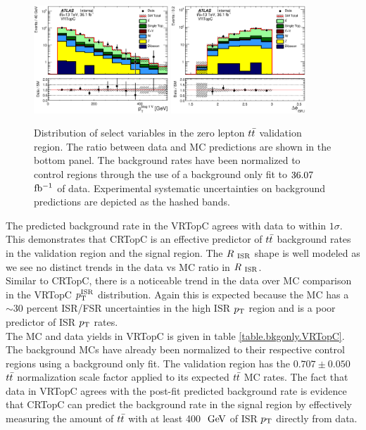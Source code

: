 \begin{figure}[htbp]
    \includegraphics[width=0.45\textwidth]{figures/ttbar/postfit/CA_pTbV1_VRTopC_log}
        \includegraphics[width=0.45\textwidth]{figures/ttbar/postfit/CA_dphiISRI_VRTopC_log}
  \caption[Distribution of select variables in the zero lepton $\ttbar$ validation region]{Distribution of select variables in the zero lepton $\ttbar$ validation region.  The ratio between data and MC predictions are shown in the bottom panel.  The background rates have been normalized to control regions through the use of a background only fit to $36.07$ $\mbox{fb$^{-1}$}$ of data.  Experimental systematic uncertainties on background predictions are depicted as the hashed bands. }
\label{fig:ttbar0Lep1bVRISR}
\end{figure}

\indent The predicted background rate in the VRTopC agrees with data to within $1\sigma$.  This demonstrates that CRTopC is an effective predictor of $\ttbar$ background rates in the validation region and the signal region.  The $R_{~\mathrm{ISR}}$ shape is well modeled as we see no distinct trends in the data vs MC ratio in $R_{~\mathrm{ISR}}$. \\

\indent Similar to CRTopC, there is a noticeable trend in the data over MC comparison in the VRTopC $p_{\mathrm{T}}^{\mathrm{ISR}}$ distribution.  Again this is expected because the MC has a $\sim30$ percent ISR/FSR uncertainties in the high ISR $p_{\mathrm{T}}$ region and is a poor predictor of ISR $p_{\mathrm{T}}$ rates.  \\

\indent The MC and data yields in VRTopC is given in table \ref{table.bkgonly.VRTopC}.  The background MCs have already been normalized to their respective control regions using a background only fit.  The validation region has the $0.707 \pm 0.050$ $\ttbar$ normalization scale factor applied to its expected $\ttbar$ MC rates.  The fact that data in VRTopC agrees with the post-fit predicted background rate is evidence that CRTopC can predict the background rate in the signal region by effectively measuring the amount of $\ttbar$ with at least 400 $\gev$ of ISR $p_{\mathrm{T}}$ directly from data.    \\

